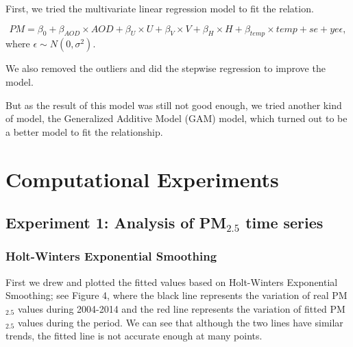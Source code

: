 \documentclass[10pt]{article}
\newcommand{\alennote}[1]{{\color{green}{Alen: {#1}}}}
\begin{document}
First, we tried the multivariate linear regression model to fit the relation. 

$$PM = \beta_0 + \beta_{AOD}\times AOD + \beta_{U}\times U + \beta_{V}\times V + \beta_{H}\times H + \beta_{temp}\times temp + se + ye\epsilon, $$
where $\epsilon\sim N(0, \sigma^2)$.

We also removed the outliers and did the stepwise regression to improve the model. 

But as the result of this model was still not good enough, we tried another
kind of model, the  Generalized Additive Model (GAM) model, which turned out to
be a better model to fit the relationship.









\section{Computational Experiments}

\subsection{Experiment 1: Analysis of PM$_{2.5}$ time series}

\subsubsection{Holt-Winters Exponential Smoothing}
First we drew and plotted the fitted values based on Holt-Winters Exponential
Smoothing; see Figure 4, where the black line represents the variation of real PM$_{2.5}$ values
during 2004-2014 and the red line represents the variation of fitted PM$_{2.5}$ values
during the period. We can see that although the two lines have similar trends,
the fitted line is not accurate enough at many points.
\end{document}
